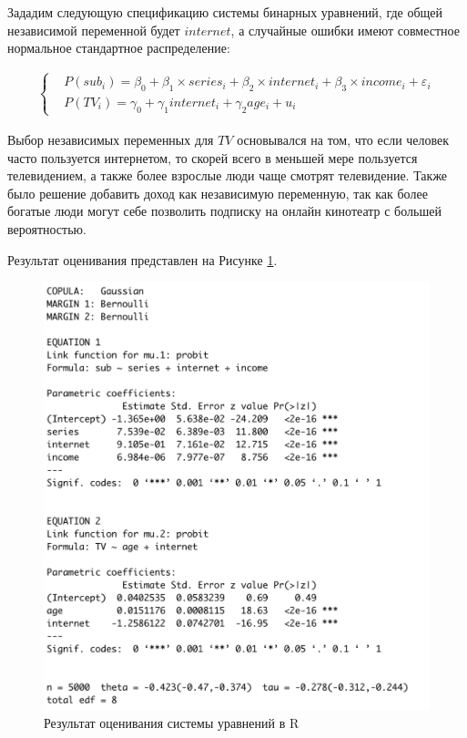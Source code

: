 \documentclass[a4paper,12pt]{article}
\begin{document}
	\vspace{0.2cm}
	
	Зададим следующую спецификацию системы бинарных уравнений, где общей независимой переменной будет $internet$, а случайные ошибки имеют совместное нормальное стандартное распределение:
	
	\begin{align*}
		\left\{
		\begin{aligned}
			& P(sub_i) =\beta_0 + \beta_1\times series_i+ \beta_2 \times internet_i+\beta_3\times income_i+\varepsilon_i\\
			& P(TV_i )= \gamma_0 + \gamma_1 internet_i+ \gamma_2  age_i+u_i
		\end{aligned}
		\right.
	\end{align*}

	Выбор независимых переменных для $TV$ основывался на том, что если человек часто пользуется интернетом, то скорей всего в меньшей мере пользуется телевидением, а также более взрослые люди чаще смотрят телевидение.  Также было решение добавить доход как независимую переменную, так как более богатые люди могут себе позволить подписку на онлайн кинотеатр с большей вероятностью.
		
	Результат оценивания представлен на Рисунке \ref{systema}.
	
	\begin{figure}[!h] \centering
		\caption{Результат оценивания системы уравнений в R}
		\label{systema}
		\includegraphics[scale=0.6]{system1.png}
	\end{figure}
\end{document}
